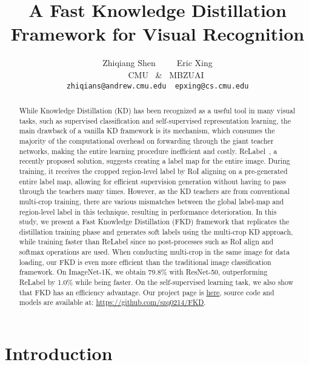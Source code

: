 \documentclass[10pt,twocolumn,letterpaper]{article}
\begin{document}
\title{A Fast Knowledge Distillation Framework for Visual Recognition}

\author{Zhiqiang Shen~~~~~Eric Xing\\
~~~~CMU ~\&~ MBZUAI\\
{\tt\small zhiqians@andrew.cmu.edu~~epxing@cs.cmu.edu}
}
\maketitle

\begin{abstract}
While Knowledge Distillation (KD) has been recognized as a useful tool in many visual tasks, such as supervised classification and self-supervised representation learning, the main drawback of a vanilla KD framework is its mechanism, which consumes the majority of the computational overhead on forwarding through the giant teacher networks, making the entire learning procedure inefficient and costly.
ReLabel~\cite{yun2021re}, a recently proposed solution, suggests creating a label map for the entire image. During training, it receives the cropped region-level label by RoI aligning on a pre-generated entire label map, allowing for efficient supervision generation without having to pass through the teachers many times. However, as the KD teachers are from conventional multi-crop training, there are various mismatches between the global label-map and region-level label in this technique, resulting in performance deterioration. In this study, we present a Fast Knowledge Distillation (FKD) framework that replicates the distillation training phase and generates soft labels using the multi-crop KD approach, while training faster than ReLabel since no post-processes such as RoI align and softmax operations are used. When conducting multi-crop in the same image for data loading, our FKD is even more efficient than the traditional image classification framework. On ImageNet-1K, we obtain 79.8\% with ResNet-50, outperforming ReLabel by 1.0\% while being faster. On the self-supervised learning task, we also show that FKD has an efficiency advantage. Our project page is \href{http://zhiqiangshen.com/projects/FKD/index.html}{here}, source code and models are available at: \url{https://github.com/szq0214/FKD}. 
\end{abstract}

\vspace{-0.15in}
\section{Introduction}
\label{sec:intro}
\end{document}
